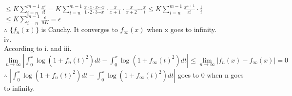 \documentclass{article}
\begin{document}
\hskip 5cm $\displaystyle \leq K \sum \limits_{i = n}^{m-1} \frac{x^i}{i!} = K \sum \limits_{i = n}^{m-1} \frac{x \cdot x \cdot x \cdots x}{1 \cdot 2 \cdot 3 \cdots x} \cdot \frac{x}{x+1} \cdot \frac{x}{x+2} \cdots \frac{x}{i} \leq K \sum \limits_{i = n}^{m-1} \frac{x^{x+1}}{x!}
\cdot \frac{1}{i}$\\

\hskip 5cm $\displaystyle \leq K \sum \limits_{i = n}^{m-1}\frac{\epsilon}{nK} = \epsilon$\\

$\therefore$ \qquad $\{f_n(x)\}$ is Cauchy. It converges to $f_{\infty}(x)$ when x goes to infinity.\\

iv.\\

According to i. and  iii.\\

$\lim \limits_{n \to \infty} \left|\int_0^x \log{(1 + f_n(t)^2)} dt - \int_0^x \log{(1+f_{\infty}(t)^2)} dt\right| \leq \lim \limits_{n \to \infty}\left|f_n(x) - f_{\infty}(x)\right| = 0$\\

$\therefore$ \qquad $\left|\int_0^x \log{(1 + f_n(t)^2)} dt - \int_0^x \log{(1+f_{\infty}(t)^2)} dt\right|$ goes to 0 when n goes to infinity.\\

\vskip 2cm
\end{document}
